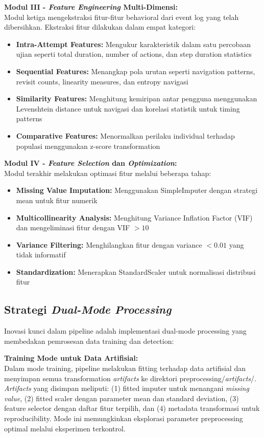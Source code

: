 \textbf{Modul III - \textit{Feature Engineering} Multi-Dimensi:} \\
Modul ketiga mengekstraksi fitur-fitur behavioral dari event log yang telah dibersihkan. Ekstraksi fitur dilakukan dalam empat kategori:
\begin{itemize}
    \item \textbf{Intra-Attempt Features:} Mengukur karakteristik dalam satu percobaan ujian seperti total duration, number of actions, dan step duration statistics
    \item \textbf{Sequential Features:} Menangkap pola urutan seperti navigation patterns, revisit counts, linearity measures, dan entropy navigasi
    \item \textbf{Similarity Features:} Menghitung kemiripan antar pengguna menggunakan Levenshtein distance untuk navigasi dan korelasi statistik untuk timing patterns
    \item \textbf{Comparative Features:} Menormalkan perilaku individual terhadap populasi menggunakan z-score transformation
\end{itemize}

\textbf{Modul IV - \textit{Feature Selection} dan \textit{Optimization}:} \\
Modul terakhir melakukan optimasi fitur melalui beberapa tahap:
\begin{itemize}
    \item \textbf{Missing Value Imputation:} Menggunakan SimpleImputer dengan strategi mean untuk fitur numerik
    \item \textbf{Multicollinearity Analysis:} Menghitung Variance Inflation Factor (VIF) dan mengeliminasi fitur dengan VIF $> 10$
    \item \textbf{Variance Filtering:} Menghilangkan fitur dengan variance $< 0.01$ yang tidak informatif
    \item \textbf{Standardization:} Menerapkan StandardScaler untuk normalisasi distribusi fitur
\end{itemize}

\subsection{Strategi \textit{Dual-Mode Processing}}
\label{sec:dualModeStrategy}

Inovasi kunci dalam pipeline adalah implementasi dual-mode processing yang membedakan pemrosesan data training dan detection:

\textbf{Training Mode untuk Data Artifisial:} \\
Dalam mode training, pipeline melakukan fitting terhadap data artifisial dan menyimpan semua transformation \textit{artifacts} ke direktori preprocessing/\textit{artifacts}/. \textit{Artifacts} yang disimpan meliputi: (1) fitted imputer untuk menangani \textit{missing value}, (2) fitted scaler dengan parameter mean dan standard deviation, (3) feature selector dengan daftar fitur terpilih, dan (4) metadata transformasi untuk reproducibility. Mode ini memungkinkan eksplorasi parameter preprocessing optimal melalui eksperimen terkontrol.

